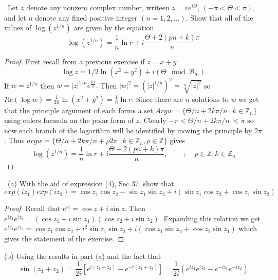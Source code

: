 \documentclass[11pt]{amsart}
\theoremstyle{definition}
\numberwithin{theorem}{section}
\numberwithin{definition}{section}
\numberwithin{equation}{section}
\def\scriptb{{\mathcal B}}
\begin{document}
\medskip {}\ Let $z$ denote any nonzero complex number, writeen $z = re^{i\Theta}$, $(-\pi < \Theta < \pi),$ and let $n$ denote any fixed positive integer $(n = 1, 2, \dots).$ Show that all of the values of $\log(z^{1/n})$ are given by the equation
\begin{equation*}
	\log(z^{1/n}) = \frac{1}{n} \ln r + i \frac{\Theta + 2(pn +k)\pi}{n}
\end{equation*}
\begin{proof}
First recall from a previous exercise if $z = x+y$
\begin{equation*}
		\log z = 1/2 \ln (x^2 + y^2) + i (\Theta \mod \scriptb_m)
	\end{equation*}	
	If $w = z^{1/n}$ then $w = |z|^{1/n}e^{\frac{i\Theta}{n}}.$ Then $|w|^2 = (|z|^{1/n})^2 = \sqrt[n]{|z|^2}$ so $Re(\log w) = \frac{1}{2n}\ln(x^2 + y^2) = \frac{1}{n}\ln r.$ Since there are $n$ solutions to $w$ we get that the principle argument of each forms a set $Arg w = \{\Theta/n +2k\pi/n\ |\ k \in \mathbb{Z}_n\}$ using eulers formula on the polar form of $z$. Clearly 
	$-\pi < \Theta/n +2k\pi/n\ < \pi$ so now each branch of the logarithm will be identified by moving the principle by $2\pi$. Thus 
	$arg w = \{\Theta/n +2k\pi/n + \rho2\pi\ |\ k \in \mathbb{Z}_n, \rho \in \mathbb{Z}\}$ gives
	\begin{equation*}
		\log(z^{1/n}) = \frac{1}{n} \ln r + i \frac{\Theta + 2(pn +k)\pi}{n},\;\;\;\;\;\;\;\;;\;\;\;\ p\in \mathbb{Z}, k \in \mathbb{Z}_n
	\end{equation*}
\end{proof}
\medskip {}\ (a) With the aid of expression (4), Sec 37. show that 
\begin{equation*}
	exp(iz_1)exp(iz_2) = \cos z_1 \cos z_2 - \sin z_1 \sin z_2 + i(\sin z_1 \cos z_2 + \cos z_1 \sin z_2)
\end{equation*}
\begin{proof}
	Recall that $e^{iz} = \cos z + i \sin z.$ Then $e^{iz_1}e^{iz_2} = (\cos z_1 + i\sin z_1)(\cos z_2 + i \sin z_2)$. Expanding this relation we get $e^{iz_1}e^{iz_2} = \cos z_1 \cos z_2 + i^2 \sin z_1 \sin z_2 + i(\cos z_1 \sin z_2 + \cos z_2 \sin z_1)$ which gives the statement of the exercise.
\end{proof}
(b)  Using the results in part (a) and the fact that
\begin{equation*}
	\sin(z_1 + z_2) = \frac{1}{2i}\left[e^{i(z_1 + z_2)} - e^{-i(z_1 + z_2)}\right] = \frac{1}{2i}\left(e^{iz_1}e^{iz_2} - e^{-iz_1}e^{-iz_2}\right)
\end{equation*}
\end{document}
